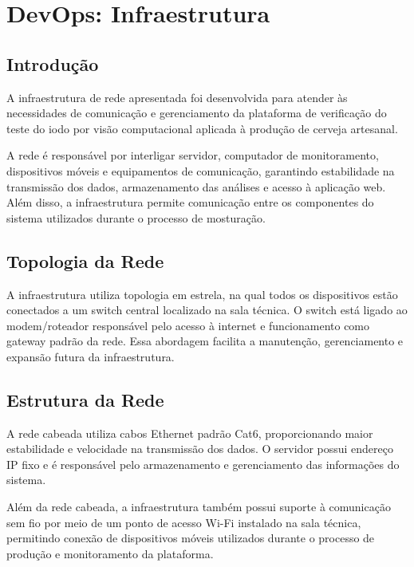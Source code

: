 \section{DevOps: Infraestrutura}

\subsection{Introdução}

A infraestrutura de rede apresentada foi desenvolvida para atender às necessidades de comunicação e gerenciamento da plataforma de verificação do teste do iodo por visão computacional aplicada à produção de cerveja artesanal.

A rede é responsável por interligar servidor, computador de monitoramento, dispositivos móveis e equipamentos de comunicação, garantindo estabilidade na transmissão dos dados, armazenamento das análises e acesso à aplicação web. Além disso, a infraestrutura permite comunicação entre os componentes do sistema utilizados durante o processo de mosturação.

\subsection{Topologia da Rede}

A infraestrutura utiliza topologia em estrela, na qual todos os dispositivos estão conectados a um switch central localizado na sala técnica. O switch está ligado ao modem/roteador responsável pelo acesso à internet e funcionamento como gateway padrão da rede. Essa abordagem facilita a manutenção, gerenciamento e expansão futura da infraestrutura.

\subsection{Estrutura da Rede}

A rede cabeada utiliza cabos Ethernet padrão Cat6, proporcionando maior estabilidade e velocidade na transmissão dos dados. O servidor possui endereço IP fixo e é responsável pelo armazenamento e gerenciamento das informações do sistema.

Além da rede cabeada, a infraestrutura também possui suporte à comunicação sem fio por meio de um ponto de acesso Wi-Fi instalado na sala técnica, permitindo conexão de dispositivos móveis utilizados durante o processo de produção e monitoramento da plataforma.

